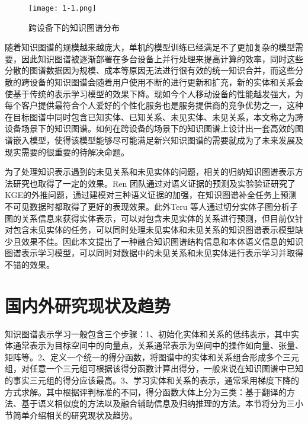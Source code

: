 \begin{figure}
  \centering
  \texttt{[image: 1-1.png]}
  \caption{跨设备下的知识图谱分布}
  \label{fig:1-1}
\end{figure}

随着知识图谱的规模越来越庞大，单机的模型训练已经满足不了更加复杂的模型需要，因此知识图谱被逐渐部署在多台设备上并行处理来提高计算的效率，同时这些分散的图谱数据因为规模、成本等原因无法进行很有效的统一知识合并，而这些分散的跨设备的知识图谱会随着用户使用不断的进行更新和扩充，新的实体和关系会使基于传统的表示学习模型的效果下降。现如今个人移动设备的性能越发强大，为每个客户提供最符合个人爱好的个性化服务也是服务提供商的竞争优势之一，这种在目标图谱中同时包含已知实体、已知关系、未见实体、未见关系，本文称之为跨设备场景下的知识图谱。如何在跨设备的场景下的知识图谱上设计出一套高效的图谱嵌入模型，使得该模型能够尽可能满足新兴知识图谱的需要就成为了未来发展及现实需要的很重要的待解决命题。

为了处理知识表示遇到的未见关系和未见实体的问题，相关的归纳知识图谱表示方法研究也取得了一定的效果。Ren \cite{li2022does}团队通过对语义证据的预测及实验验证研究了KGE的外推问题，通过建模对三种语义证据的加强，在知识图谱补全任务上预测不可见数据时都取得了更好的表现效果。此外Teru \cite{teru2020inductive}等人通过切分实体子图分析子图的关系信息来获得实体表示，可以对包含未见实体的关系进行预测，但目前仅针对包含未见实体的任务，可以同时处理未见实体和未见关系的知识图谱表示模型缺少且效果不佳。因此本文提出了一种融合知识图谱结构信息和本体语义信息的知识图谱表示学习模型，可以同时对数据中的未见关系和未见实体进行表示学习并取得不错的效果。

\section{国内外研究现状及趋势}
知识图谱表示学习一般包含三个步骤：1、初始化实体和关系的低纬表示，其中实体通常表示为目标空间中的向量点，关系通常表示为空间中的操作如向量、张量、矩阵等。2、定义一个统一的得分函数，将图谱中的实体和关系组合形成多个三元组，对任意一个三元组可根据该得分函数计算出得分，一般来说在知识图谱中已知的事实三元组的得分应该最高。3、学习实体和关系的表示，通常采用梯度下降的方式求解。其中根据评判标准的不同，得分函数大体上分为三类：基于翻译的方法、基于语义相似度的方法以及融合辅助信息及归纳推理的方法。本节将分为三小节简单介绍相关的研究现状及趋势。

